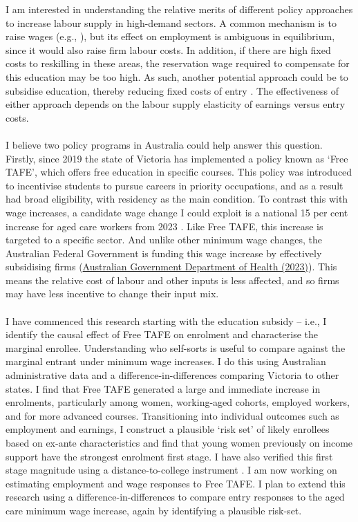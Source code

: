  I am interested in understanding the relative merits of different policy approaches to increase labour supply in high-demand sectors. A common mechanism is to raise wages (e.g., \cite{dalbo_finan_rossi2013}), but its effect on employment is ambiguous in equilibrium, since it would also raise firm labour costs. In addition, if there are high fixed costs to reskilling in these areas, the reservation wage required to compensate for this education may be too high. As such, another potential approach could be to subsidise education, thereby reducing fixed costs of entry \citep{schoonover2026}. The effectiveness of either approach depends on the labour supply elasticity of earnings versus entry costs. \\~\\I believe two policy programs in Australia could help answer this question. Firstly, since 2019 the state of Victoria has implemented a policy known as `Free TAFE', which offers free education in specific courses. This policy was introduced to incentivise students to pursue careers in priority occupations, and as a result had broad eligibility, with residency as the main condition. To contrast this with wage increases, a candidate wage change I could exploit is a national 15 per cent increase for aged care workers from 2023 \citep{fwc_agedcare2022}. Like Free TAFE, this increase is targeted to a specific sector. And unlike other minimum wage changes, the Australian Federal Government is  funding this wage increase by effectively subsidising firms (\href{https://www.health.gov.au/ministers/the-hon-mark-butler-mp/media/budget-2023-24-delivering-the-largest-ever-pay-rise-to-aged-care-workers?language=en&utm_source=miragenews&utm_medium=miragenews&utm_campaign=news}{Australian Government Department of Health (2023)}). This means the relative cost of labour and other inputs is less affected, and so firms may have less incentive to change their input mix. \\~\\
I have commenced this research starting with the education subsidy -- i.e., I identify the causal effect of Free TAFE on enrolment and characterise the marginal enrollee. Understanding who self-sorts is useful to compare against the marginal entrant under minimum wage increases. I do this using Australian administrative data and a difference-in-differences comparing Victoria to other states. I find that Free TAFE generated a large and immediate increase in enrolments, particularly among women, working-aged cohorts, employed workers, and for more advanced courses. Transitioning into individual outcomes such as employment and earnings, I construct a plausible `risk set' of likely enrollees based on ex-ante characteristics and find that young women previously on income support have the strongest enrolment first stage. I have also verified this first stage magnitude using a distance-to-college instrument \citep{card1995}. I am now working on estimating employment and wage responses to Free TAFE. I plan to extend this research using a difference-in-differences to compare entry responses to the aged care minimum wage increase, again by identifying a plausible risk-set.
